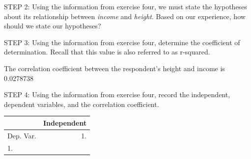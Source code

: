 \documentclass[11pt, chapterprefix=true]{scrbook}\usepackage[]{graphicx}\usepackage[]{color}
\begin{document}
\begin{exercises}
  \begin{exercise} %

    STEP 2: Using the information from exercise four, we must state the hypotheses about its relationship between {\textit{income}} and {\textit{height}}.  Based on our experience, how should we state our hypotheses?

    \vspace{5mm}

    \end{exercise}
    \vspace{2mm}

  \begin{exercise} %

    STEP 3: Using the information from exercise four, determine the coefficient of determination.  Recall that this value is also referred to as r-squared.

    \vspace{5mm}

    \end{exercise}
    \vspace{2mm}
    \begin{solution}

       The correlation coefficient between the respondent's height and income is 0.0278738

    \end{solution}

  \begin{exercise} %


    STEP 4: Using the information from exercise four, record the independent, dependent variables, and the correlation coefficient.

{\scriptsize{
    \begin{table}[ht]
    \centering
    \begin{tabular}{lr} \hline
        &  \multicolumn{1}{c}{Independent} \\ \hline

    Dep. Var. & 1. \underline{\phantom{xxxxxxxx}}      \\ \hline
    1. \underline{\phantom{xxxxxxxx}}  &  \underline{\phantom{xxxxxxxx}}       \\ \hline


\end{tabular}
\end{table}}}
\end{exercise}
\end{exercises}
\end{document}
